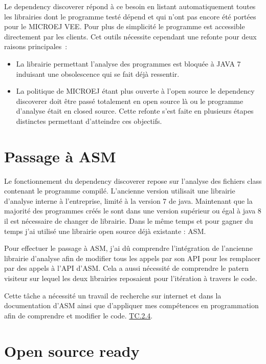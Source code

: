 \documentclass[french,a4paper,12pt]{report}
\begin{document}
Le dependency discoverer répond à ce besoin en listant automatiquement toutes les librairies dont le programme testé dépend et qui n’ont pas encore été portées pour le MICROEJ VEE. Pour plus de simplicité le programme est accessible directement par les clients. Cet outils nécessite cependant une refonte pour deux raisons principales :
\begin{itemize}

\item La librairie permettant l’analyse des programmes est bloquée à JAVA 7 induisant une obsolescence qui se fait déjà ressentir.

\item La politique de MICROEJ étant plus ouverte à l’open source le dependency discoverer doit être passé totalement en open source là ou le programme d’analyse était en closed source.
Cette refonte s’est faite en plusieurs étapes distinctes permettant d’atteindre ces objectifs.

\end{itemize}

\section{Passage à ASM }

Le fonctionnement du dependency discoverer repose sur l'analyse des fichiers class contenant le programme compilé. L'ancienne version utilisait une librairie d'analyse interne à l'entreprise, limité à la version 7 de java. Maintenant que la majorité des programmes créés le sont dans une version supérieur ou égal à java 8 il est nécessaire  de changer de librairie. Dans le même temps et pour gagner du temps j'ai utilisé une librairie open source déjà existante : ASM.

Pour effectuer le passage à ASM, j'ai dû comprendre l'intégration de l'ancienne librairie d'analyse afin de modifier tous les appels par son API pour les remplacer par des appels à l'API d'ASM. Cela a aussi nécessité de comprendre le patern visiteur sur lequel les deux librairies reposaient pour l'itération à travers le code. 

Cette tâche a nécessité un travail de recherche sur internet et dans la documentation d’ASM ainsi que d’appliquer mes compétences en programmation afin de comprendre et modifier le code. \hyperlink{competences}{TC.2.4}.

\section{Open source ready}
\end{document}
